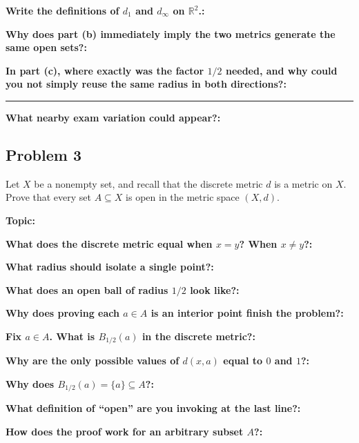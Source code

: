 \documentclass[12pt]{article}
\newcommand{\fillfield}[1]{%
  \par\noindent\textbf{#1:}\enspace\hrulefill\par\vspace{3pt}%
}
\newcommand{\fillfieldlong}[1]{%
  \par\noindent\textbf{#1:}\par\vspace{1.5cm}%
  \noindent\rule{\linewidth}{0.35pt}\par\vspace{4pt}%
}
\begin{document}
\bigskip

\begin{tcolorbox}[
  enhanced, breakable,
  colback  = reflectcyan,
  colframe = cyan!55!black,
  fonttitle = \bfseries,
  title = {\textsc{Reflection \& Variation}}
]
\fillfield{Write the definitions of $d_1$ and $d_\infty$ on $\mathbb{R}^2$.}
\fillfield{Why does part (b) immediately imply the two metrics generate the same open sets?}
\fillfieldlong{In part (c), where exactly was the factor $1/2$ needed, and why could you not simply reuse the same radius in both directions?}
\fillfield{What nearby exam variation could appear?}
\end{tcolorbox}

\newpage
\subsection{Problem 3}

\begin{tcolorbox}[
  enhanced, breakable,
  colback  = probblue,
  colframe = blue!55!black,
  fonttitle = \bfseries,
  title = {\textsc{Problem Statement}\hfill Homework 8, Problem 3}
]
Let $X$ be a nonempty set, and recall that the discrete metric $d$ is a metric on $X$.
Prove that every set $A \subseteq X$ is open in the metric space $(X, d)$.
\end{tcolorbox}

\bigskip

\begin{tcolorbox}[
  enhanced, breakable,
  colback  = pass1green,
  colframe = green!55!black,
  fonttitle = \bfseries,
  title = {Pass 1 \enspace\textbf{--}\enspace First Diagnosis}
]
\fillfield{Topic}
\fillfield{What does the discrete metric equal when $x=y$? When $x\ne y$?}
\fillfield{What radius should isolate a single point?}
\fillfield{What does an open ball of radius $1/2$ look like?}
\fillfield{Why does proving each $a\in A$ is an interior point finish the problem?}
\end{tcolorbox}

\bigskip

\begin{tcolorbox}[
  enhanced, breakable,
  colback  = pass2yellow,
  colframe = yellow!65!black,
  fonttitle = \bfseries,
  title = {Pass 2 \enspace\textbf{--}\enspace Proof Recipe Card}
]
\fillfield{Fix $a\in A$. What is $B_{1/2}(a)$ in the discrete metric?}
\fillfield{Why are the only possible values of $d(x,a)$ equal to $0$ and $1$?}
\fillfield{Why does $B_{1/2}(a)=\{a\}\subseteq A$?}
\fillfield{What definition of ``open'' are you invoking at the last line?}
\fillfield{How does the proof work for an arbitrary subset $A$?}
\end{tcolorbox}
\end{document}
